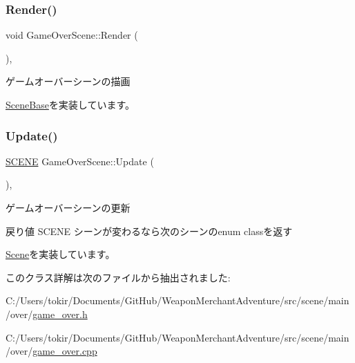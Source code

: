 \mbox{\label{class_game_over_scene_a3fd3123c8660c25b01ca2f1e16615072}} 
\subsubsection{\texorpdfstring{Render()}{Render()}}
{\footnotesize\ttfamily void Game\+Over\+Scene\+::\+Render (\begin{DoxyParamCaption}{ }\end{DoxyParamCaption})\hspace{0.3cm}{\ttfamily [final]}, {\ttfamily [virtual]}}



ゲームオーバーシーンの描画 



\mbox{\hyperlink{class_scene_base_ad981674ce731ea267f398e889bbb9dc3}{Scene\+Base}}を実装しています。

\mbox{\label{class_game_over_scene_a27d347ed1ff81cbd252e3bcc3f2989a8}} 
\subsubsection{\texorpdfstring{Update()}{Update()}}
{\footnotesize\ttfamily \mbox{\hyperlink{scene__base_8h_a24cee5343fb9d0706ead6e8601f363be}{S\+C\+E\+NE}} Game\+Over\+Scene\+::\+Update (\begin{DoxyParamCaption}{ }\end{DoxyParamCaption})\hspace{0.3cm}{\ttfamily [final]}, {\ttfamily [virtual]}}



ゲームオーバーシーンの更新 

\begin{DoxyReturn}{戻り値}
S\+C\+E\+NE シーンが変わるなら次のシーンのenum classを返す 
\end{DoxyReturn}


\mbox{\hyperlink{class_scene_acb50f8104e5a7cfecbdececa7d5f1b39}{Scene}}を実装しています。



このクラス詳解は次のファイルから抽出されました\+:\begin{DoxyCompactItemize}
\item 
C\+:/\+Users/tokir/\+Documents/\+Git\+Hub/\+Weapon\+Merchant\+Adventure/src/scene/main/over/\mbox{\hyperlink{game__over_8h}{game\+\_\+over.\+h}}\item 
C\+:/\+Users/tokir/\+Documents/\+Git\+Hub/\+Weapon\+Merchant\+Adventure/src/scene/main/over/\mbox{\hyperlink{game__over_8cpp}{game\+\_\+over.\+cpp}}\end{DoxyCompactItemize}
